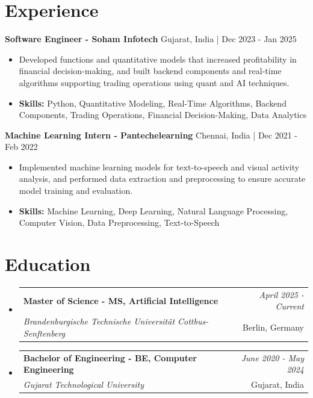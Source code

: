 \documentclass[a4paper,11pt]{article}
\makeatletter
\newcommand{\resumeSubheading}[4]{
\vspace{0.5mm}\item
    \begin{tabular*}{\linewidth}[t]{l@{\extracolsep{\fill}}r}
        \textbf{#1} & \textit{\footnotesize{#4}} \\
        \textit{\footnotesize{#3}} &  \footnotesize{#2}\\
    \end{tabular*}
    \vspace{-2.4mm}
}
\makeatother
\begin{document}
\section{\textbf{Experience}}


\vspace{1mm}
  \textbf{Software Engineer - Soham Infotech} \hfill Gujarat, India | Dec 2023 - Jan 2025
\vspace{-1.5mm} %
\begin{itemize}
  \item Developed functions and quantitative models that increased profitability in financial decision-making, and built backend components and real-time algorithms supporting trading operations using quant and AI techniques.

\vspace{-2mm}
  \item \textbf{Skills:} Python, Quantitative Modeling, Real-Time Algorithms, Backend Components, Trading Operations, Financial Decision-Making, Data Analytics
\end{itemize}

\vspace{1mm}
  \textbf{Machine Learning Intern - Pantechelearning} \hfill Chennai, India | Dec 2021 - Feb 2022
\vspace{-1.5mm} %
\begin{itemize}
  \item Implemented machine learning models for text-to-speech and visual activity analysis, and performed data extraction and preprocessing to ensure accurate model training and evaluation.
\vspace{-2mm}
  \item \textbf{Skills:} Machine Learning, Deep Learning, Natural Language Processing, Computer Vision, Data Preprocessing, Text-to-Speech
\end{itemize}\section{\textbf{Education}}
\vspace{-0.4mm}

\begin{itemize}[leftmargin=0.15in, label={}]
\resumeSubheading
{Master of Science - MS, Artificial Intelligence }{Berlin, Germany}
{Brandenburgische Technische Universität Cottbus-Senftenberg  }{April 2025 - Current}

\vspace{1.0mm} %
\resumeSubheading
{Bachelor of Engineering - BE, Computer Engineering  }{Gujarat, India}
{Gujarat Technological University }{June 2020 - May 2024}

\end{itemize}
\end{document}
